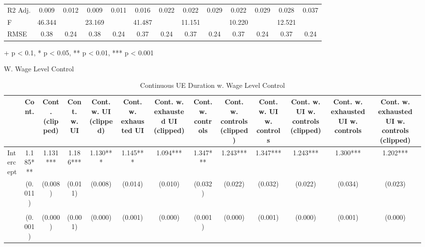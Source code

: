 \documentclass[
]{article}
\begin{document}
\begin{table}[t]
\begin{tabular*}{\linewidth}{@{\extracolsep{\fill}}lcccccccccccc}
R2 Adj. & 0.009 & 0.012 & 0.009 & 0.011 & 0.016 & 0.022 & 0.022 & 0.029 & 0.022 & 0.029 & 0.028 & 0.037 \\ 
F & 46.344 &  & 23.169 &  & 41.487 &  & 11.151 &  & 10.220 &  & 12.521 &  \\ 
RMSE & 0.38 & 0.24 & 0.38 & 0.24 & 0.37 & 0.24 & 0.37 & 0.24 & 0.37 & 0.24 & 0.37 & 0.24 \\ 
\bottomrule
\end{tabular*}
\begin{minipage}{\linewidth}
+ p < 0.1, * p < 0.05, ** p < 0.01, *** p < 0.001\\
\end{minipage}
\end{table}

W. Wage Level Control

\begin{table}[t]
\caption{\label{tab:unnamed-chunk-29}Continuous UE Duration w. Wage Level Control} 
\fontsize{12.0pt}{14.4pt}\selectfont
\begin{tabular*}{\linewidth}{@{\extracolsep{\fill}}lcccccccccccc}
\toprule
  & Cont. & Cont. (clipped) & Cont. w. UI & Cont. w. UI (clipped) & Cont. w. exhausted UI & Cont. w. exhausted UI (clipped) & Cont. w. controls & Cont. w. controls (clipped) & Cont. w. UI w. controls & Cont. w. UI w. controls (clipped) & Cont. w. exhausted UI w. controls & Cont. w. exhausted UI w. controls (clipped) \\ 
\midrule\addlinespace[2.5pt]
Intercept & 1.185*** & 1.131*** & 1.186*** & 1.130*** & 1.145*** & 1.094*** & 1.347*** & 1.243*** & 1.347*** & 1.243*** & 1.300*** & 1.202*** \\ 
 & (0.011) & (0.008) & (0.011) & (0.008) & (0.014) & (0.010) & (0.032) & (0.022) & (0.032) & (0.022) & (0.034) & (0.023) \\ 
{\cellcolor[HTML]{ADD8E6}{Hourly Wage of Lost Job}} & {\cellcolor[HTML]{ADD8E6}{-0.009***}} & {\cellcolor[HTML]{ADD8E6}{-0.006***}} & {\cellcolor[HTML]{ADD8E6}{-0.009***}} & {\cellcolor[HTML]{ADD8E6}{-0.006***}} & {\cellcolor[HTML]{ADD8E6}{-0.009***}} & {\cellcolor[HTML]{ADD8E6}{-0.006***}} & {\cellcolor[HTML]{ADD8E6}{-0.011***}} & {\cellcolor[HTML]{ADD8E6}{-0.007***}} & {\cellcolor[HTML]{ADD8E6}{-0.011***}} & {\cellcolor[HTML]{ADD8E6}{-0.007***}} & {\cellcolor[HTML]{ADD8E6}{-0.011***}} & {\cellcolor[HTML]{ADD8E6}{-0.007***}} \\ 
 & (0.001) & (0.000) & (0.001) & (0.000) & (0.001) & (0.000) & (0.001) & (0.000) & (0.001) & (0.000) & (0.001) & (0.000) \\ 

\end{tabular*}
\end{table}
\end{document}
